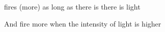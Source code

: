 \documentclass[a4paper]{article}
\title{}
\date{}
\author{Mohammad Rahmani}
\begin{document}
    \maketitle
    fires (more) as long as there is there is light
    
    And fire more when the intensity of light is higher
    
    
\end{document}
